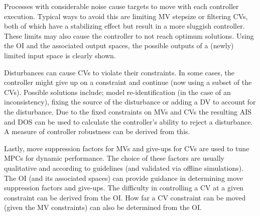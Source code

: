 Processes with considerable noise cause targets to move with each controller execution.
Typical ways to avoid this are limiting MV stepsize or filtering CVs, both of which have a stabilizing effect but result in a more sluggish controller. 
These limits may also cause the controller to not reach optimum solutions.
Using the OI and the associated output spaces, the possible outputs of a (newly) limited input space is clearly shown.
    
Disturbances can cause CVs to violate their constraints. 
In some cases, the controller might give up on a constraint and continue (now using a subset of the CVs).
Possible solutions include; model re-identification (in the case of an inconsistency), fixing the source of the disturbance or adding a DV to account for the disturbance.
Due to the fixed constraints on MVs and CVs the resulting AIS and DOS can be used to calculate the controller's ability to reject a disturbance. 
A measure of controller robustness can be derived from this.
    
Lastly, move suppression factors for MVs and give-ups for CVs are used to tune MPCs for dynamic performance.
The choice of these factors are usually qualitative and according to guidelines (and validated via offline simulations).
The OI (and its associated spaces) can provide guidance in determining move suppression factors and give-ups. 
The difficulty in controlling a CV at a given constraint can be derived from the OI.
How far a CV constraint can be moved (given the MV constraints) can also be determined from the OI.

